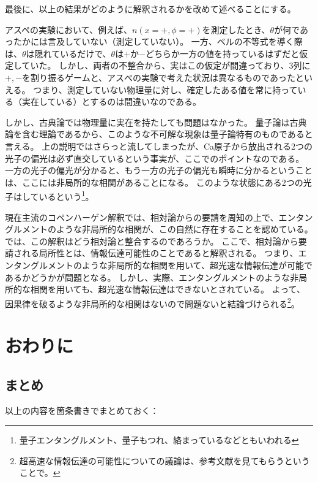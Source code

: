 \documentclass[10pt,b5paper,papersize,dvipdfmx]{jsbook}
\begin{document}
最後に、以上の結果がどのように解釈されるかを改めて述べることにする。\par
アスペの実験において、例えば、$n(x=+,\phi=+)$を測定したとき、$\theta$が何であったかには言及していない（測定していない）。
一方、ベルの不等式を導く際は、$\theta$は隠れているだけで、$\theta$は$+$か$-$どちらか一方の値を持っているはずだと仮定していた。
しかし、両者の不整合から、実はこの仮定が間違っており、3列に$+,-$を割り振るゲームと、アスぺの実験で考えた状況は異なるものであったといえる。
つまり、測定していない物理量に対し、確定したある値を常に持っている（実在している）とするのは間違いなのである。\par
しかし、古典論では物理量に実在を持たしても問題はなかった。
量子論は古典論を含む理論であるから、このような不可解な現象は量子論特有のものであると言える。
上の説明ではさらっと流してしまったが、Ca原子から放出される2つの光子の偏光は必ず直交しているという事実が、ここでのポイントなのである。
一方の光子の偏光が分かると、もう一方の光子の偏光も瞬時に分かるということは、ここには非局所的な相関があることになる。
このような状態にある2つの光子はしているという\footnote{
  量子エンタングルメント、量子もつれ、絡まっているなどともいわれる
}。\par
現在主流のコペンハーゲン解釈では、相対論からの要請を周知の上で、エンタングルメントのような非局所的な相関が、この自然に存在することを認めている。
では、この解釈はどう相対論と整合するのであろうか。
ここで、相対論から要請される局所性とは、情報伝達可能性のことであると解釈される。
つまり、エンタングルメントのような非局所的な相関を用いて、超光速な情報伝達が可能であるかどうかが問題となる。
しかし、実際、エンタングルメントのような非局所的な相関を用いても、超光速な情報伝達はできないとされている。
よって、因果律を破るような非局所的な相関はないので問題ないと結論づけられる\footnote{
  超高速な情報伝達の可能性についての議論は、参考文献\cite{arafuna}を見てもらうということで。
}。

\fi
\section{おわりに}\label{sec:3}

\subsection{まとめ}
以上の内容を箇条書きでまとめておく：
\end{document}
